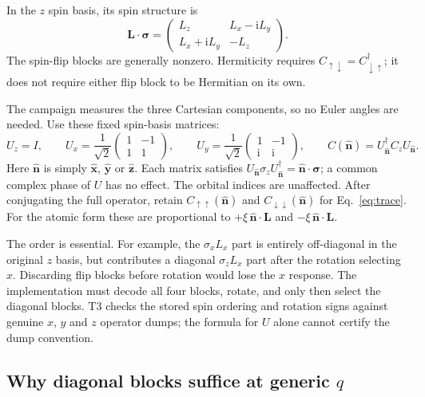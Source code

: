 \documentclass[11pt,a4paper]{article}
\numberwithin{equation}{section}
\newcommand{\vct}[1]{\bm{#1}}
\newcommand{\nh}{\hat{\vct n}}
\newcommand{\ii}{\mathrm i}
\begin{document}
In the $z$ spin basis, its spin structure is
\begin{equation}\label{eq:blocks}
 \vct L\cdot\vct\sigma=
 \begin{pmatrix}
 L_z&L_x-\ii L_y\\
 L_x+\ii L_y&-L_z
 \end{pmatrix}.
\end{equation}
The spin-flip blocks are generally nonzero. Hermiticity requires
$C_{\uparrow\downarrow}=C_{\downarrow\uparrow}^{\dagger}$; it does not
require either flip block to be Hermitian on its own.

The campaign measures the three Cartesian components, so no Euler
angles are needed. Use these fixed spin-basis matrices:
\begin{equation}\label{eq:rotation}
 U_z=I,\qquad
 U_x=\frac{1}{\sqrt2}\begin{pmatrix}1&-1\\1&1\end{pmatrix},
 \qquad
 U_y=\frac{1}{\sqrt2}\begin{pmatrix}1&-1\\\ii&\ii\end{pmatrix},
 \qquad C(\nh)=U_{\nh}^{\dagger}C_zU_{\nh}.
\end{equation}
Here $\nh$ is simply $\hat{\vct x}$, $\hat{\vct y}$ or $\hat{\vct z}$.
Each matrix satisfies $U_{\nh}\sigma_zU_{\nh}^{\dagger}
=\nh\cdot\vct\sigma$; a common complex phase of $U$ has no effect.
The orbital indices are unaffected. After conjugating the full operator,
retain $C_{\uparrow\uparrow}(\nh)$ and $C_{\downarrow\downarrow}(\nh)$
for Eq.~\eqref{eq:trace}. For the atomic form these are proportional to
$+\xi\,\nh\cdot\vct L$ and $-\xi\,\nh\cdot\vct L$.


The order is essential. For example, the $\sigma_xL_x$ part is entirely
off-diagonal in the original $z$ basis, but contributes a diagonal
$\sigma_zL_x$ part after the rotation selecting $x$.
Discarding flip blocks before rotation would lose the $x$ response.
The implementation must decode all four blocks, rotate, and only then
select the diagonal blocks. T3 checks the stored spin ordering and rotation
signs against genuine $x$, $y$ and $z$ operator dumps; the formula for $U$
alone cannot certify the dump convention.

\subsection{Why diagonal blocks suffice at generic \(q\)}
\end{document}
